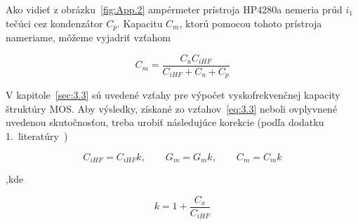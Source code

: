 Ako vidieť z obrázku~\ref{fig:App.2} ampérmeter prístroja HP4280a
nemeria prúd $i_1$ tečúci cez kondenzátor $C_p$. Kapacitu $C_m$, ktorú
pomocou tohoto prístroja nameriame, môžeme vyjadriť vzťahom

\begin{equation}\label{eq:E.6}
  C_m = \frac{C_{u} C_{iHF}} {C_{iHF}+C_{u}+C_{p}}
\end{equation}

V kapitole~\ref{sec:3.3} sú uvedené vzťahy pre výpočet
vyskofrekvenčnej kapacity štruktúry MOS\@.  Aby výsledky, získané zo
vzťahov~\ref{eq:3.3} neboli ovplyvnené uvedenou skutočnosťou, treba
urobiť následujúce korekcie (podľa dodatku 1.\ literatúry~\cite{App.4})

\begin{equation}\label{eq:E.7}
  C_{iHF}=C_{iHF}k, \qquad G_{m}=G_{m}k, \qquad C_{m}=C_{m}k
\end{equation}

,kde

\begin{equation}\label{eq:E.8}
  k = 1 + \frac{C_x}{C_{iHF}}
\end{equation}
